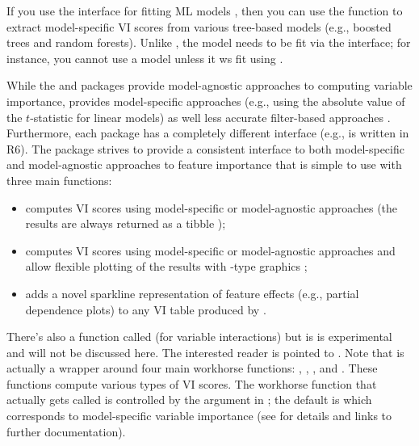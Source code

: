 If you use the  interface for fitting ML models \citep{mlr-pkg}, then you can use the  function to extract model-specific VI scores from various tree-based models (e.g., boosted trees and random forests). Unlike , the model needs to be fit via the  interface; for instance, you cannot use  a  model \citep{gbm-pkg} unless it ws fit using .

While the  and  packages provide model-agnostic approaches to computing variable importance,  provides model-specific approaches (e.g., using the absolute value of the $t$-statistic for linear models) as well less accurate filter-based approaches . Furthermore, each package has a completely different interface (e.g.,  is written in R6). The  package \citep{vip-pkg} strives to provide a consistent interface to both model-specific and model-agnostic approaches to feature importance that is simple to use with three main functions:

\begin{itemize}
 
  \item {} computes VI scores using model-specific or model-agnostic approaches (the results are always returned as a tibble \citep{tibble-pkg});
  
  \item {} computes VI scores using model-specific or model-agnostic approaches and allow flexible plotting of the results with -type graphics \citep{ggplot2-pkg};
  
  \item {} adds a novel sparkline representation of feature effects (e.g., partial dependence plots) to any VI table produced by .

\end{itemize}

There's also a function called  (for variable interactions) but is is experimental and will not be discussed here. The interested reader is pointed to \citet{greenwell-simple-2018}. Note that  is actually a wrapper around four main workhorse functions: , , , and . These functions compute various types of VI scores. The workhorse function that actually gets called is controlled by the  argument in ; the default is  which corresponds to model-specific variable importance (see  for details and links to further documentation). 


